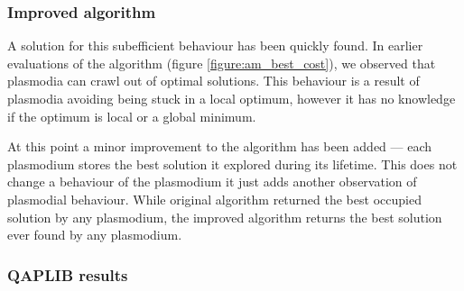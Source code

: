 \subsubsection{Improved algorithm}

A solution for this subefficient behaviour has been quickly found. In earlier evaluations of the algorithm (figure \ref{figure:am_best_cost}), we observed that plasmodia can crawl out of optimal solutions. This behaviour is a result of plasmodia avoiding being stuck in a local optimum, however it has no knowledge if the optimum is local or a global minimum. 

At this point a minor improvement to the algorithm has been added --- each plasmodium stores the best solution it explored during its lifetime. This does not change a behaviour of the plasmodium it just adds another observation of plasmodial behaviour. While original algorithm returned the best occupied solution by any plasmodium, the improved algorithm returns the best solution ever found by any plasmodium.


\subsubsection{QAPLIB results}

